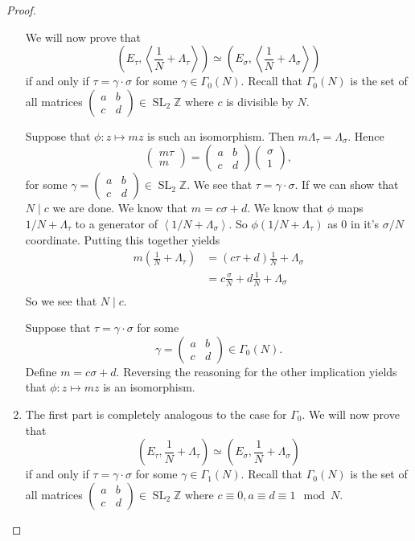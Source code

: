 \documentclass[a4paper]{article}
\theoremstyle{theoremdd}
\theoremstyle{definitiondd}
\theoremstyle{remarkdd}
\newcommand{\Z}{\mathbb{Z}}
\newcommand{\ltr}{\par \noindent \framebox[1\width]{ $\implies$ } \hspace{.2cm}}
\newcommand{\rtl}{\par \noindent \framebox[1\width]{ $\impliedby$ } \hspace{.2cm} }
\DeclareMathOperator{\SL}{SL}
\begin{document}
\begin{proof}
\begin{enumerate}
	
	We will now prove that \[
		\left( E_\tau , \left<\frac{1}{N} + \Lambda_\tau \right> \right) \simeq 
		\left( E_\sigma, \left<\frac{1}{N} + \Lambda_\sigma \right> \right) 
	\]
	if and only if $\tau = \gamma \cdot \sigma$ for some $\gamma \in \Gamma_0(N)$.
	Recall that $\Gamma_0(N)$ is the set of all matrices $\begin{pmatrix} a & b \\ c & d \end{pmatrix} \in \SL_2\Z$ where $c$ is divisible by $N$. 
	\ltr Suppose that $\phi: z \mapsto m z$ is such an isomorphism. Then $m \Lambda_\tau = \Lambda_\sigma$. Hence \[
	\begin{pmatrix} m \tau \\ m \end{pmatrix}  = 
	\begin{pmatrix} a & b \\ c & d \end{pmatrix} \begin{pmatrix} \sigma \\ 1 \end{pmatrix} 
	,\] 
	for some $\gamma = \begin{pmatrix} a & b \\ c & d \end{pmatrix}  \in \SL_2\Z$. 
	We see that $\tau = \gamma \cdot \sigma$. If we can show that  $N \mathbin{\mid} c$ we are done.
	We know that $m = c \sigma + d$. 
	We know that $\phi$ maps $1 / N + \Lambda_\tau$ to a generator of $\left<1 / N + \Lambda_\sigma \right>$. 
	So $\phi( 1 / N + \Lambda_\tau)$ as $0$ in it's $\sigma / N$ coordinate.
	Putting this together yields \begin{align*}
		m\left(\frac{1}{N} + \Lambda_\tau\right) &= (c \tau + d) \frac{1}{N} + \Lambda_\sigma \\ 
		&= c \frac{\sigma}{N} + d \frac{1}{N} + \Lambda_\sigma \\
	\end{align*}
	So we see that $N \mathbin{|} c$. 
	\rtl Suppose that $\tau = \gamma \cdot \sigma$ for some \[
		\gamma = \begin{pmatrix} a & b \\ c & d  \end{pmatrix} \in \Gamma_0(N)
	.\] 
	Define  $m = c \sigma + d$. Reversing the reasoning for the other implication yields that  $\phi: z\mapsto  m z$ is an isomorphism. 

	\item The first part is completely analogous to the case for $\Gamma_0.$ 
	We will now prove that \[
		\left( E_\tau , \frac{1}{N} + \Lambda_\tau \right) \simeq 
		\left( E_\sigma, \frac{1}{N} + \Lambda_\sigma \right) 
	\]
	if and only if $\tau = \gamma \cdot \sigma$ for some $\gamma \in \Gamma_1(N)$.
	Recall that $\Gamma_0(N)$ is the set of all matrices $\begin{pmatrix} a & b \\ c & d \end{pmatrix} \in \SL_2\Z$ where $c \equiv 0, a \equiv d \equiv 1 \mod N$. 


\end{enumerate}
\end{proof}
\end{document}
